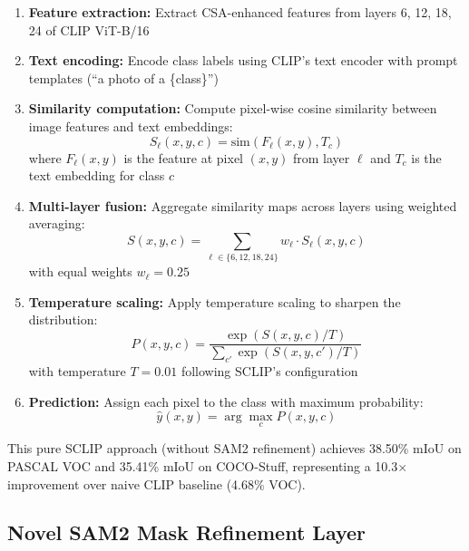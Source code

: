\begin{enumerate}
    \item \textbf{Feature extraction:} Extract CSA-enhanced features from layers 6, 12, 18, 24 of CLIP ViT-B/16

    \item \textbf{Text encoding:} Encode class labels using CLIP's text encoder with prompt templates (``a photo of a \{class\}'')

    \item \textbf{Similarity computation:} Compute pixel-wise cosine similarity between image features and text embeddings:
    \begin{equation}
    S_{\ell}(x, y, c) = \text{sim}(F_\ell(x, y), T_c)
    \end{equation}
    where $F_\ell(x, y)$ is the feature at pixel $(x, y)$ from layer $\ell$ and $T_c$ is the text embedding for class $c$

    \item \textbf{Multi-layer fusion:} Aggregate similarity maps across layers using weighted averaging:
    \begin{equation}
    S(x, y, c) = \sum_{\ell \in \{6,12,18,24\}} w_\ell \cdot S_\ell(x, y, c)
    \end{equation}
    with equal weights $w_\ell = 0.25$

    \item \textbf{Temperature scaling:} Apply temperature scaling to sharpen the distribution:
    \begin{equation}
    P(x, y, c) = \frac{\exp(S(x, y, c) / T)}{\sum_{c'} \exp(S(x, y, c') / T)}
    \end{equation}
    with temperature $T = 0.01$ following SCLIP's configuration

    \item \textbf{Prediction:} Assign each pixel to the class with maximum probability:
    \begin{equation}
    \hat{y}(x, y) = \arg\max_c P(x, y, c)
    \end{equation}
\end{enumerate}

This pure SCLIP approach (without SAM2 refinement) achieves 38.50\% mIoU on PASCAL VOC and 35.41\% mIoU on COCO-Stuff, representing a 10.3$\times$ improvement over naive CLIP baseline (4.68\% VOC).

\subsection{Novel SAM2 Mask Refinement Layer}

